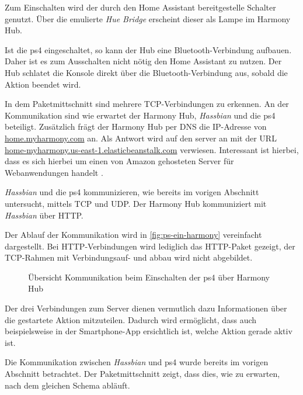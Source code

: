 Zum Einschalten wird der durch den Home Assistant bereitgestelle Schalter genutzt. Über die emulierte \textit{Hue Bridge} erscheint dieser als Lampe im Harmony Hub.

Ist die \ac{ps4} eingeschaltet, so kann der Hub eine Bluetooth-Verbindung aufbauen. Daher ist es zum Ausschalten nicht nötig den Home Assistant zu nutzen.
Der Hub schlatet die Konsole direkt über die Bluetooth-Verbindung aus, sobald die Aktion beendet wird.

In dem Paketmittschnitt sind mehrere TCP-Verbindungen zu erkennen.
An der Kommunikation sind wie erwartet der Harmony Hub, \textit{Hassbian} und die \ac{ps4} beteiligt.
Zusätzlich frägt der Harmony Hub per DNS die IP-Adresse von \url{home.myharmony.com} an.
Als Antwort wird auf den server an mit der URL \url{home-myharmony.us-east-1.elasticbeanstalk.com} verwiesen.
Interessant ist hierbei,
dass es sich hierbei um einen von Amazon gehosteten Server für Webanwendungen handelt \cite{AWSElast48:online}.

\textit{Hassbian} und die \ac{ps4} kommunizieren, wie bereits im vorigen Abschnitt untersucht, mittels TCP und UDP.
Der Harmony Hub kommuniziert mit \textit{Hassbian} über HTTP.

Der Ablauf der Kommunikation wird in \autoref{fig:ps-ein-harmony} vereinfacht dargestellt.
Bei HTTP-Verbindungen wird lediglich das HTTP-Paket gezeigt, der TCP-Rahmen mit Verbindungsauf- und abbau wird nicht abgebildet.

\begin{figure}[ht!]
    \centering
    \resizebox{\textwidth}{!}{
        
    }
    \caption{Übersicht Kommunikation beim Einschalten der \ac{ps4} über Harmony Hub}
    \label{fig:ps-ein-harmony}
\end{figure}

Der drei Verbindungen zum Server dienen vermutlich dazu Informationen über die gestartete Aktion mitzuteilen.
Dadurch wird ermöglicht, dass auch beispielsweise in der Smartphone-App ersichtlich ist, welche Aktion gerade aktiv ist.

Die Kommunikation zwischen \textit{Hassbian} und \ac{ps4} wurde bereits im vorigen Abschnitt betrachtet.
Der Paketmittschnitt zeigt, dass dies, wie zu erwarten, nach dem gleichen Schema abläuft.

